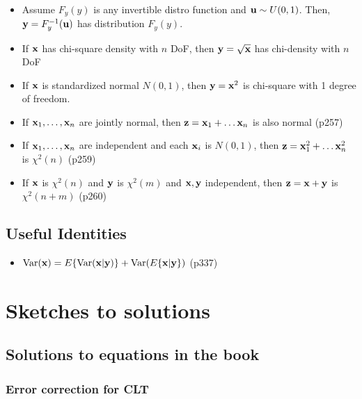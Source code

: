 \documentclass[a4paper, oneside]{book}
\begin{document}
\begin{itemize}
\item Assume $F_y(y)$ is any invertible distro function and $\mathbf u \sim U(0,1)$. Then, $\mathbf y = F_y^{-1} (\mathbf u)$ has distribution $F_y(y)$.
\item If $\mathbf x$ has chi-square density with $n$ DoF, then $\mathbf y = \sqrt{\mathbf x}$ has chi-density with $n$ DoF
\item If $\mathbf x$ is standardized normal $N(0,1)$, then $\mathbf y= \mathbf x^2$ is chi-square with 1 degree of freedom.
\item If $\mathbf{x}_1, \hdots, \mathbf{x}_n$ are jointly normal, then $\mathbf{z} = \mathbf{x}_1 + \hdots \mathbf{x}_n$ is also normal (p257)
\item If $\mathbf{x}_1, \hdots, \mathbf{x}_n$ are independent and each $\mathbf{x}_i$ is $N(0,1)$, then $\mathbf{z} = \mathbf{x}_1^2 + \hdots \mathbf{x}_n^2$ is $\chi^2(n)$ (p259)
\item If $\mathbf{x}$ is $\chi^2(n)$ and $\mathbf{y}$ is $\chi^2(m)$ and $\mathbf{x,y}$ independent, then $\mathbf{z} = \mathbf{x+y}$ is $\chi^2(n+m)$ (p260)
\end{itemize}

\section{Useful Identities}
\begin{itemize}
\item $\text{Var}(\mathbf{x}) = E\{\text{Var}(\mathbf{x|y})\} + \text{Var}(E\{\mathbf{x|y}\})$ (p337)
\end{itemize}
























\chapter*{Sketches to solutions}
\section{Solutions to equations in the book}

\subsection{Error correction for CLT}
\label{sec:error_correction}
\end{document}
